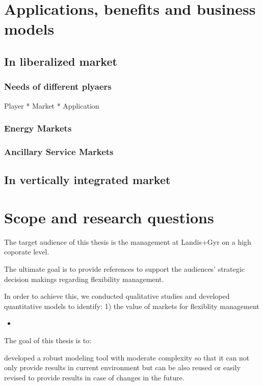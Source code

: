 \section{Applications, benefits and business models}
\subsection{In liberalized market}

\subsubsection{Needs of different plyaers}

Player * Market * Application


\subsubsection{Energy Markets}


\subsubsection{Ancillary Service Markets}

\subsection{In vertically integrated market}


\section{Scope and research questions}

The target audience of this thesis is the management at Landis+Gyr on a high coporate level.

The ultimate goal is to provide references to support the audiences' strategic decision makings regarding flexibility management.

In order to achieve this, we conducted qualitative studies and developed quantitative models to identify: 1) the value of markets for flexiblity management

\begin{itemize}
	\item 
\end{itemize}

The goal of this thesis is to:

developed a robust modeling tool with moderate complexity so that it can not only provide results in current environment but can be also reused or easily revised to provide results in case of changes in the future.

